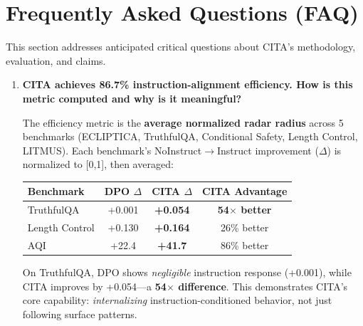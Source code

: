 
\onecolumn
\vspace{-2mm}
\section{Frequently Asked Questions (FAQ)}
\label{sec:faq}

This section addresses anticipated critical questions about CITA's methodology, evaluation, and claims.

\vspace{4mm}

\begin{enumerate}[label=\textbf{Q\arabic*.}, leftmargin=*, itemsep=8pt]

\item \textbf{CITA achieves 86.7\% instruction-alignment efficiency. How is this metric computed and why is it meaningful?}

 The efficiency metric is the \textbf{average normalized radar radius} across 5 benchmarks (ECLIPTICA, TruthfulQA, Conditional Safety, Length Control, LITMUS). Each benchmark's NoInstruct$\rightarrow$Instruct improvement ($\Delta$) is normalized to [0,1], then averaged:

\begin{table}[H]
\centering
\small
\renewcommand{\arraystretch}{1.2}
\begin{tabular}{@{}lccc@{}}
\toprule
\textbf{Benchmark} & \textbf{DPO $\Delta$} & \textbf{CITA $\Delta$} & \textbf{CITA Advantage} \\
\midrule
TruthfulQA & +0.001 & \textbf{+0.054} & \textbf{54$\times$ better} \\ \hline
Length Control & +0.130 & \textbf{+0.164} & 26\% better \\ \hline
AQI & +22.4 & \textbf{+41.7} & 86\% better \\
\bottomrule
\end{tabular}
\end{table}

On TruthfulQA, DPO shows \textit{negligible} instruction response (+0.001), while CITA improves by +0.054---a \textbf{54$\times$ difference}. This demonstrates CITA's core capability: \textit{internalizing} instruction-conditioned behavior, not just following surface patterns.


\end{enumerate}
